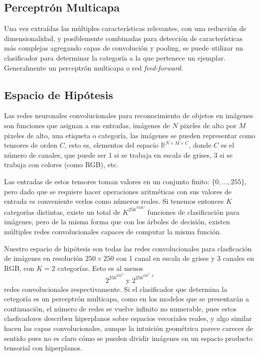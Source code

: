 \documentclass[spanish,11pt,letterpaper]{article}
\begin{document}
\subsection{Perceptrón Multicapa}

Una vez extraídas las múltiples características relevantes, con una reducción
de dimensionalidad, y posiblemente combinadas para detección de características
más complejas agregando capas de convolución y pooling, se puede utilizar un
clasificador para determinar la categoría a la que pertenece un ejemplar.
Generalmente un perceptrón multicapa o red \textit{feed-forward}.

\subsection{Espacio de Hipótesis}

Las redes neuronales convolucionales para reconocimiento de objetos en imágenes
son funciones que asignan a sus entradas, imágenes de $N$ pixeles de alto por $M$
pixeles de alto, una etiqueta o categoría, las imágenes se pueden representar
como tensores de orden $C$, esto es, elementos del espacio
$\mathbb{R}^{N\times M\times C}$, donde $C$ es el número de canales, que puede ser
1 si se trabaja en escala de grises, 3 si se trabaja con colores (como RGB), etc.

Las entradas de estos tensores toman valores en un conjunto finito: $\{0,\ldots,255\}$,
pero dado que se requiere hacer operaciones aritméticas con sus valores de entrada
es conveniente verlos como números reales. Si tenemos entonces $K$ categorías
distintas, existe un total de $K^{256^{NMC}}$ funciones de clasificación para
imágenes, pero de la misma forma que con los árboles de decisión, existen múltiples
redes convolucionales capaces de computar la misma función.

Nuestro espacio de hipótesis son todas las redes convolucionales para clasficación
de imágenes en resolución $250 \times 250$ con 1 canal en escala de grises y 3
canales en RGB, con $K = 2$ categorías. Esto es al menos
\[ 2^{256^{250^2}} \text{  y  } 2^{256^{250^2 \cdot 3}}\]
redes convolucionales respectivamente. Si el clasificador que determina la cetegoría
es un perceptrón multicapa, como en los modelos que se presentarán a continuación,
el número de redes se vuelve infinito no numerable, pues estos clasficadores
describen hiperplanos sobre espacios vecoriales reales, y algo similar hacen las
capas convolucionales, aunque la intuición geométrica parece carecer de sentido pues no
es claro cómo se pueden dividir imágenes en un espacio producto tensorial con
hiperplanos.
\end{document}
